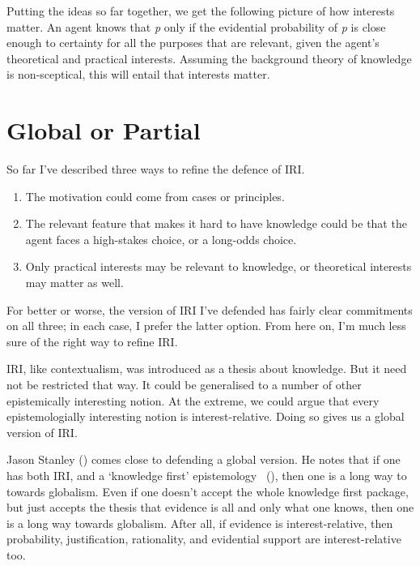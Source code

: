 \documentclass[
  10pt,
  letterpaper,
  DIV=11,
  numbers=noendperiod,
  twoside]{scrartcl}
\providecommand{\tightlist}{%
  \setlength{\itemsep}{0pt}\setlength{\parskip}{0pt}}\usepackage{longtable,booktabs,array}
\begin{document}
Putting the ideas so far together, we get the following picture of how
interests matter. An agent knows that \emph{p} only if the evidential
probability of \emph{p} is close enough to certainty for all the
purposes that are relevant, given the agent's theoretical and practical
interests. Assuming the background theory of knowledge is non-sceptical,
this will entail that interests matter.

\section{Global or Partial}\label{globalorpartial}

So far I've described three ways to refine the defence of IRI.

\begin{enumerate}
\def\labelenumi{\arabic{enumi}.}
\tightlist
\item
  The motivation could come from cases or principles.
\item
  The relevant feature that makes it hard to have knowledge could be
  that the agent faces a high-stakes choice, or a long-odds choice.
\item
  Only practical interests may be relevant to knowledge, or theoretical
  interests may matter as well.
\end{enumerate}

For better or worse, the version of IRI I've defended has fairly clear
commitments on all three; in each case, I prefer the latter option. From
here on, I'm much less sure of the right way to refine IRI.

IRI, like contextualism, was introduced as a thesis about knowledge. But
it need not be restricted that way. It could be generalised to a number
of other epistemically interesting notion. At the extreme, we could
argue that every epistemologially interesting notion is
interest-relative. Doing so gives us a global version of IRI.

Jason Stanley () comes close to
defending a global version. He notes that if one has both IRI, and a
`knowledge first' epistemology
~(), then one is a long
way to towards globalism. Even if one doesn't accept the whole knowledge
first package, but just accepts the thesis that evidence is all and only
what one knows, then one is a long way towards globalism. After all, if
evidence is interest-relative, then probability, justification,
rationality, and evidential support are interest-relative too.
\end{document}
